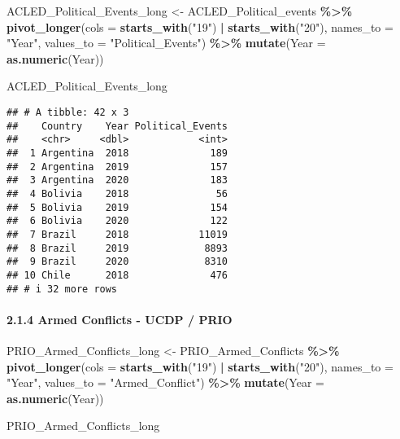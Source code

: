\documentclass[
  11pt,
]{article}
\newenvironment{Shaded}{\begin{snugshade}}{\end{snugshade}}
\newcommand{\AttributeTok}[1]{\textcolor[rgb]{0.13,0.29,0.53}{#1}}
\newcommand{\FunctionTok}[1]{\textcolor[rgb]{0.13,0.29,0.53}{\textbf{#1}}}
\newcommand{\NormalTok}[1]{#1}
\newcommand{\OtherTok}[1]{\textcolor[rgb]{0.56,0.35,0.01}{#1}}
\newcommand{\SpecialCharTok}[1]{\textcolor[rgb]{0.81,0.36,0.00}{\textbf{#1}}}
\newcommand{\StringTok}[1]{\textcolor[rgb]{0.31,0.60,0.02}{#1}}
\begin{document}
\begin{Shaded}
\begin{Highlighting}[]
\NormalTok{ACLED\_Political\_Events\_long }\OtherTok{\textless{}{-}}\NormalTok{ ACLED\_Political\_events }\SpecialCharTok{\%\textgreater{}\%}
 \FunctionTok{pivot\_longer}\NormalTok{(}\AttributeTok{cols =} \FunctionTok{starts\_with}\NormalTok{(}\StringTok{"19"}\NormalTok{) }\SpecialCharTok{|} \FunctionTok{starts\_with}\NormalTok{(}\StringTok{"20"}\NormalTok{), }
               \AttributeTok{names\_to =} \StringTok{"Year"}\NormalTok{, }\AttributeTok{values\_to =} \StringTok{"Political\_Events"}\NormalTok{) }\SpecialCharTok{\%\textgreater{}\%}
  \FunctionTok{mutate}\NormalTok{(}\AttributeTok{Year =} \FunctionTok{as.numeric}\NormalTok{(Year))}

\NormalTok{ACLED\_Political\_Events\_long}
\end{Highlighting}
\end{Shaded}

\begin{verbatim}
## # A tibble: 42 x 3
##    Country    Year Political_Events
##    <chr>     <dbl>            <int>
##  1 Argentina  2018              189
##  2 Argentina  2019              157
##  3 Argentina  2020              183
##  4 Bolivia    2018               56
##  5 Bolivia    2019              154
##  6 Bolivia    2020              122
##  7 Brazil     2018            11019
##  8 Brazil     2019             8893
##  9 Brazil     2020             8310
## 10 Chile      2018              476
## # i 32 more rows
\end{verbatim}

\paragraph{2.1.4 Armed Conflicts - UCDP /
PRIO}\label{armed-conflicts---ucdp-prio-1}

\begin{Shaded}
\begin{Highlighting}[]
\NormalTok{PRIO\_Armed\_Conflicts\_long }\OtherTok{\textless{}{-}}\NormalTok{ PRIO\_Armed\_Conflicts }\SpecialCharTok{\%\textgreater{}\%}
  \FunctionTok{pivot\_longer}\NormalTok{(}\AttributeTok{cols =} \FunctionTok{starts\_with}\NormalTok{(}\StringTok{"19"}\NormalTok{) }\SpecialCharTok{|} \FunctionTok{starts\_with}\NormalTok{(}\StringTok{"20"}\NormalTok{), }
               \AttributeTok{names\_to =} \StringTok{"Year"}\NormalTok{, }\AttributeTok{values\_to =} \StringTok{"Armed\_Conflict"}\NormalTok{) }\SpecialCharTok{\%\textgreater{}\%}
  \FunctionTok{mutate}\NormalTok{(}\AttributeTok{Year =} \FunctionTok{as.numeric}\NormalTok{(Year))}

\NormalTok{PRIO\_Armed\_Conflicts\_long}
\end{Highlighting}
\end{Shaded}
\end{document}
